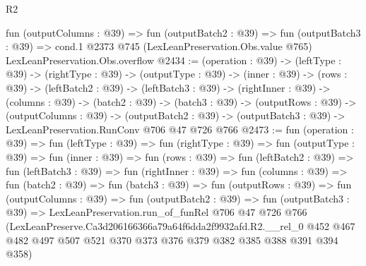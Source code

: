 \begin{lexlean}{R2}
\begin{coremodule}
  fun (outputColumns : @39) =>
  fun (outputBatch2 : @39) =>
  fun (outputBatch3 : @39) =>
  cond.{1} @2373 @745 (LexLeanPreservation.Obs.value @765) LexLeanPreservation.Obs.overflow
@2434 := (operation : @39) ->
  (leftType : @39) ->
  (rightType : @39) ->
  (outputType : @39) ->
  (inner : @39) ->
  (rows : @39) ->
  (leftBatch2 : @39) ->
  (leftBatch3 : @39) ->
  (rightInner : @39) ->
  (columns : @39) ->
  (batch2 : @39) ->
  (batch3 : @39) ->
  (outputRows : @39) ->
  (outputColumns : @39) ->
  (outputBatch2 : @39) -> (outputBatch3 : @39) -> LexLeanPreservation.RunConv @706 @47 @726 @766
@2473 := fun (operation : @39) =>
  fun (leftType : @39) =>
  fun (rightType : @39) =>
  fun (outputType : @39) =>
  fun (inner : @39) =>
  fun (rows : @39) =>
  fun (leftBatch2 : @39) =>
  fun (leftBatch3 : @39) =>
  fun (rightInner : @39) =>
  fun (columns : @39) =>
  fun (batch2 : @39) =>
  fun (batch3 : @39) =>
  fun (outputRows : @39) =>
  fun (outputColumns : @39) =>
  fun (outputBatch2 : @39) =>
  fun (outputBatch3 : @39) =>
  LexLeanPreservation.run_of_funRel
    @706
    @47
    @726
    @766
    (LexLeanPreserve.Ca3d206166366a79a64f6dda2f9932afd.R2.__rel_0
      @452
      @467
      @482
      @497
      @507
      @521
      @370
      @373
      @376
      @379
      @382
      @385
      @388
      @391
      @394
      @358)
\end{coremodule}
\end{lexlean}
